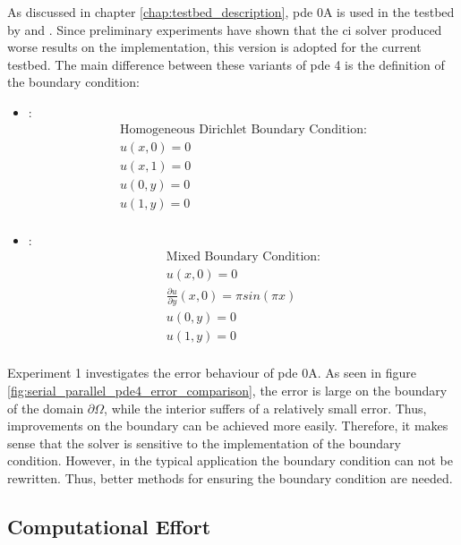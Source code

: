 \documentclass[./\jobname.tex]{subfiles}
\begin{document}
As discussed in chapter \ref{chap:testbed_description}, \gls{pde} 0A is used in the testbed by \cite{chaquet_using_2019} and \cite{mitchell_nist_2018}. Since preliminary experiments have shown that the \gls{ci} solver produced worse results on the \cite{mitchell_nist_2018} implementation, this version is adopted for the current testbed. The main difference between these variants of \gls{pde} 4 is the definition of the boundary condition: 

\begin{itemize}
	\item \underline{\textbf{\cite{mitchell_nist_2018}}}: 
	\begin{equation*}
		\begin{split}
		\text{Homogeneous Dirichlet Boundary Condition:} \\
		u(x,0) = 0 \\
		u(x,1) = 0 \\
		u(0,y) = 0 \\
		u(1,y) = 0 \\
		\end{split}
	\end{equation*}
	\item \underline{\textbf{\cite{chaquet_using_2019}}}:
	\begin{equation*}
		\begin{split}
		\text{Mixed Boundary Condition:} \\
		u(x,0) = 0 \\
		\frac{\partial u}{\partial y} (x,0) = \pi sin(\pi x) \\
		u(0,y) = 0 \\
		u(1,y) = 0 \\
		\end{split}
	\end{equation*}
\end{itemize}

Experiment 1 investigates the error behaviour of \gls{pde} 0A. As seen in figure \ref{fig:serial_parallel_pde4_error_comparison}, the error is large on the boundary of the domain $\partial \Omega$, while the interior suffers of a relatively small error. Thus, improvements on the boundary can be achieved more easily. Therefore, it makes sense that the solver is sensitive to the implementation of the boundary condition. However, in the typical application the boundary condition can not be rewritten. Thus, better methods for ensuring the boundary condition are needed. 


\subsection{Computational Effort}
\label{chap:computational_effort}
\end{document}
